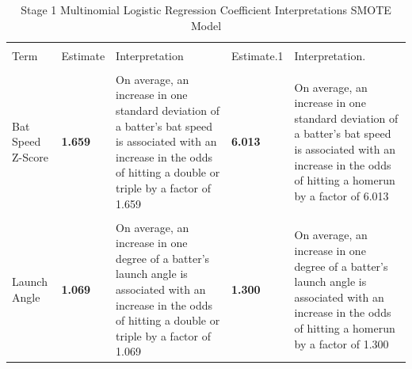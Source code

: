 \documentclass[
  letterpaper,
  DIV=11,
  numbers=noendperiod]{scrartcl}
\begin{document}
\begin{table}[!h]
\centering
\caption{\label{tab:unnamed-chunk-45}Stage 1 Multinomial Logistic Regression Coefficient Interpretations SMOTE Model}
\centering
\fontsize{10}{12}\selectfont
\begin{tabular}[t]{>{\raggedright\arraybackslash}p{3cm}>{\raggedright\arraybackslash}p{2cm}>{\raggedright\arraybackslash}p{4cm}>{\raggedright\arraybackslash}p{2cm}>{\raggedright\arraybackslash}p{4cm}}
\toprule
\multicolumn{1}{c}{ } & \multicolumn{2}{c}{Double/Triple} & \multicolumn{2}{c}{Homerun} \\
\cmidrule(l{3pt}r{3pt}){2-3} \cmidrule(l{3pt}r{3pt}){4-5}
Term & Estimate & Interpretation & Estimate.1 & Interpretation.\\
\midrule
\cellcolor{gray!10}{Swing Length Z-Score} & \textbf{\cellcolor{gray!10}{1.177}} & \cellcolor{gray!10}{On average, an increase in one standard deviation of a batter's swing length is associated with an increase in the odds of hitting a double or triple by a factor of 1.177.} & \textbf{\cellcolor{gray!10}{1.522}} & \cellcolor{gray!10}{On average, an increase in one standard deviation of a batter's swing length is associated with an increase in the odds of hitting a homerun by a factor of 1.522}\\
Bat Speed Z-Score & \textbf{1.659} & On average, an increase in one standard deviation of a batter's bat speed is associated with an increase in the odds of hitting a double or triple by a factor of 1.659 & \textbf{6.013} & On average, an increase in one standard deviation of a batter's bat speed is associated with an increase in the odds of hitting a homerun by a factor of 6.013\\
\cellcolor{gray!10}{Release Speed Z-Score} & \cellcolor{gray!10}{0.99} & \cellcolor{gray!10}{On average, an increase in one standard deviation of a pitcher's release speed is associated with an increase in the odds of hitting a double or triple by a factor of 0.99} & \textbf{\cellcolor{gray!10}{1.092}} & \cellcolor{gray!10}{On average, an increase in one standard deviation of a pitcher's release speed is associated with an increase in the odds of hitting a homerun by a factor of 1.092}\\
Launch Angle & \textbf{1.069} & On average, an increase in one degree of a batter's launch angle is associated with an increase in the odds of hitting a double or triple by a factor of 1.069 & \textbf{1.300} & On average, an increase in one degree of a batter's launch angle is associated with an increase in the odds of hitting a homerun by a factor of 1.300\\

\end{tabular}
\end{table}
\end{document}
